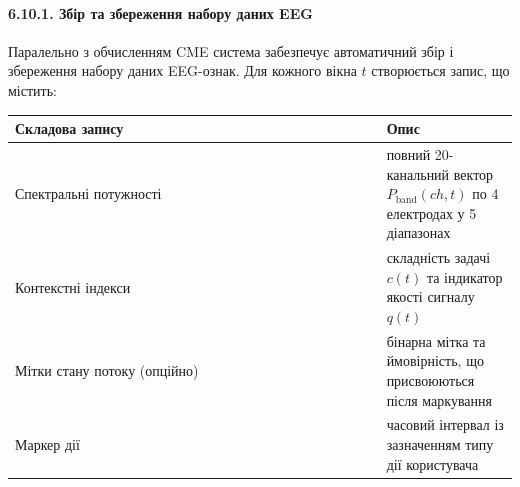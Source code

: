 \documentclass[12pt,a4paper]{article}
\begin{document}
\paragraph{6.10.1. Збір та збереження набору даних EEG}\label{ux437ux431ux456ux440-ux442ux430-ux437ux431ux435ux440ux435ux436ux435ux43dux43dux44f-ux43dux430ux431ux43eux440ux443-ux434ux430ux43dux438ux445-eeg}



Паралельно з обчисленням CME система забезпечує автоматичний збір і збереження набору даних EEG-ознак. Для кожного вікна \(t\) створюється запис, що містить:



{\def\LTcaptype{none} %

\begin{longtable}[]{@{}

  >{\raggedright\arraybackslash}p{0.7391\linewidth}

  >{\raggedright\arraybackslash}p{0.2609\linewidth}@{}}

\toprule\noalign{}

\begin{minipage}[b]{\linewidth}\raggedright

Складова запису

\end{minipage} & \begin{minipage}[b]{\linewidth}\raggedright

Опис

\end{minipage} \\

\midrule\noalign{}

\endhead

\bottomrule\noalign{}

\endlastfoot

Спектральні потужності & повний 20-канальний вектор \(P_{\text{band}}(ch, t)\) по 4 електродах у 5 діапазонах \\

Контекстні індекси & складність задачі \(c(t)\) та індикатор якості сигналу \(q(t)\) \\

Мітки стану потоку (опційно) & бінарна мітка та ймовірність, що присвоюються після маркування \\

Маркер дії & часовий інтервал із зазначенням типу дії користувача \\

\end{longtable}

}
\end{document}
